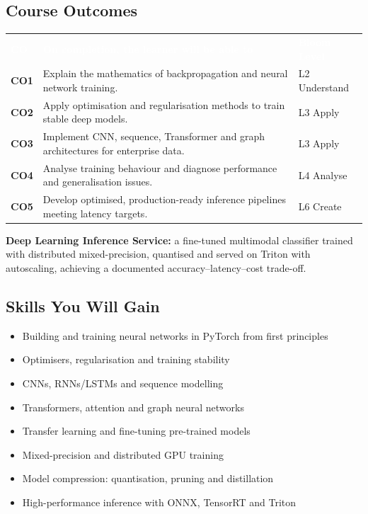 \documentclass[10pt,a4paper]{article}
\newcommand{\hdr}{\rowcolor{navy}}
\newcommand{\hw}[1]{\textcolor{white}{\bfseries #1}}
\begin{document}
\subsection*{Course Outcomes}
\par{\small\begin{tabularx}{\linewidth}{@{}>{\bfseries}p{0.9cm}Y>{\raggedright\arraybackslash}p{2.3cm}@{}}\hdr\hw{CO}&\hw{On completion, the learner will be able to}&\hw{Bloom Level}\\
CO1 & Explain the mathematics of backpropagation and neural network training. & L2 Understand\\
CO2 & Apply optimisation and regularisation methods to train stable deep models. & L3 Apply\\
CO3 & Implement CNN, sequence, Transformer and graph architectures for enterprise data. & L3 Apply\\
CO4 & Analyse training behaviour and diagnose performance and generalisation issues. & L4 Analyse\\
CO5 & Develop optimised, production-ready inference pipelines meeting latency targets. & L6 Create\\
\bottomrule\end{tabularx}}
\begin{tcolorbox}[colback=goldbg,colframe=goldl,boxrule=0.7pt,arc=2pt,title={Enterprise Capstone Product},colbacktitle=goldl!35,coltitle=navy,fonttitle=\small\bfseries]\small\textbf{Deep Learning Inference Service:} a fine-tuned multimodal classifier trained with distributed mixed-precision, quantised and served on Triton with autoscaling, achieving a documented accuracy–latency–cost trade-off.\end{tcolorbox}
\subsection*{Skills You Will Gain}\begin{multicols}{2}\begin{itemize}\small
\item Building and training neural networks in PyTorch from first principles
\item Optimisers, regularisation and training stability
\item CNNs, RNNs/LSTMs and sequence modelling
\item Transformers, attention and graph neural networks
\item Transfer learning and fine-tuning pre-trained models
\item Mixed-precision and distributed GPU training
\item Model compression: quantisation, pruning and distillation
\item High-performance inference with ONNX, TensorRT and Triton
\end{itemize}\end{multicols}
\end{document}
